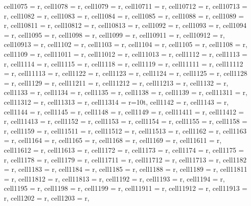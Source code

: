 \begin{landscape}
\begin{longtblr}[
  caption = {Changes in average values and effects differences significance from post hoc analysis.},
  label = {tab:appendix_LCBM_all_results_post_hocs}
]
{  cell{107}{5} = {r},
  cell{107}{8} = {r},
  cell{107}{9} = {r},
  cell{107}{11} = {r},
  cell{107}{12} = {r},
  cell{107}{13} = {r},
  cell{108}{2} = {r},
  cell{108}{3} = {r},
  cell{108}{4} = {r},
  cell{108}{5} = {r},
  cell{108}{8} = {r},
  cell{108}{9} = {r},
  cell{108}{11} = {r},
  cell{108}{12} = {r},
  cell{108}{13} = {r},
  cell{109}{2} = {r},
  cell{109}{3} = {r},
  cell{109}{4} = {r},
  cell{109}{5} = {r},
  cell{109}{8} = {r},
  cell{109}{9} = {r},
  cell{109}{11} = {r},
  cell{109}{12} = {r},
  cell{109}{13} = {r},
  cell{110}{2} = {r},
  cell{110}{3} = {r},
  cell{110}{4} = {r},
  cell{110}{5} = {r},
  cell{110}{8} = {r},
  cell{110}{9} = {r},
  cell{110}{11} = {r},
  cell{110}{12} = {r},
  cell{110}{13} = {r},
  cell{111}{2} = {r},
  cell{111}{3} = {r},
  cell{111}{4} = {r},
  cell{111}{5} = {r},
  cell{111}{8} = {r},
  cell{111}{9} = {r},
  cell{111}{11} = {r},
  cell{111}{12} = {r},
  cell{111}{13} = {r},
  cell{112}{2} = {r},
  cell{112}{3} = {r},
  cell{112}{4} = {r},
  cell{112}{5} = {r},
  cell{112}{8} = {r},
  cell{112}{9} = {r},
  cell{112}{11} = {r},
  cell{112}{12} = {r},
  cell{112}{13} = {r},
  cell{113}{2} = {r},
  cell{113}{3} = {r},
  cell{113}{4} = {r},
  cell{113}{5} = {r},
  cell{113}{8} = {r},
  cell{113}{9} = {r},
  cell{113}{11} = {r},
  cell{113}{12} = {r},
  cell{113}{13} = {r},
  cell{113}{14} = {r=10}{t},
  cell{114}{2} = {r},
  cell{114}{3} = {r},
  cell{114}{4} = {r},
  cell{114}{5} = {r},
  cell{114}{8} = {r},
  cell{114}{9} = {r},
  cell{114}{11} = {r},
  cell{114}{12} = {r},
  cell{114}{13} = {r},
  cell{115}{2} = {r},
  cell{115}{3} = {r},
  cell{115}{4} = {r},
  cell{115}{5} = {r},
  cell{115}{8} = {r},
  cell{115}{9} = {r},
  cell{115}{11} = {r},
  cell{115}{12} = {r},
  cell{115}{13} = {r},
  cell{116}{2} = {r},
  cell{116}{3} = {r},
  cell{116}{4} = {r},
  cell{116}{5} = {r},
  cell{116}{8} = {r},
  cell{116}{9} = {r},
  cell{116}{11} = {r},
  cell{116}{12} = {r},
  cell{116}{13} = {r},
  cell{117}{2} = {r},
  cell{117}{3} = {r},
  cell{117}{4} = {r},
  cell{117}{5} = {r},
  cell{117}{8} = {r},
  cell{117}{9} = {r},
  cell{117}{11} = {r},
  cell{117}{12} = {r},
  cell{117}{13} = {r},
  cell{118}{2} = {r},
  cell{118}{3} = {r},
  cell{118}{4} = {r},
  cell{118}{5} = {r},
  cell{118}{8} = {r},
  cell{118}{9} = {r},
  cell{118}{11} = {r},
  cell{118}{12} = {r},
  cell{118}{13} = {r},
  cell{119}{2} = {r},
  cell{119}{3} = {r},
  cell{119}{4} = {r},
  cell{119}{5} = {r},
  cell{119}{8} = {r},
  cell{119}{9} = {r},
  cell{119}{11} = {r},
  cell{119}{12} = {r},
  cell{119}{13} = {r},
  cell{120}{2} = {r},
  cell{120}{3} = {r},
}
\end{longtblr}
\end{landscape}
